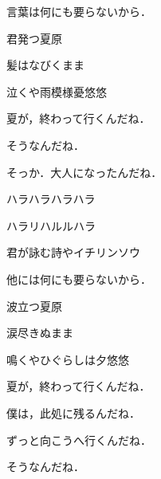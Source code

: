 \documentclass[uplatex, 12pt, dvipdfmx, twocolumn]{jsarticle}
\begin{document}
言葉は何にも要らないから．

\vspace{\baselineskip}

君発つ夏原

髪はなびくまま

泣くや雨模様憂悠悠

夏が，終わって行くんだね．

そうなんだね．

\vspace{\baselineskip}
\vspace{\baselineskip}

そっか．大人になったんだね．

\vspace{\baselineskip}

ハラハラハラハラ

ハラリハルルハラ

君が詠む詩やイチリンソウ

他には何にも要らないから．

\vspace{\baselineskip}

波立つ夏原

涙尽きぬまま

鳴くやひぐらしは夕悠悠

夏が，終わって行くんだね．

\vspace{\baselineskip}

僕は，此処に残るんだね．

ずっと向こうへ行くんだね．

そうなんだね．
\end{document}
